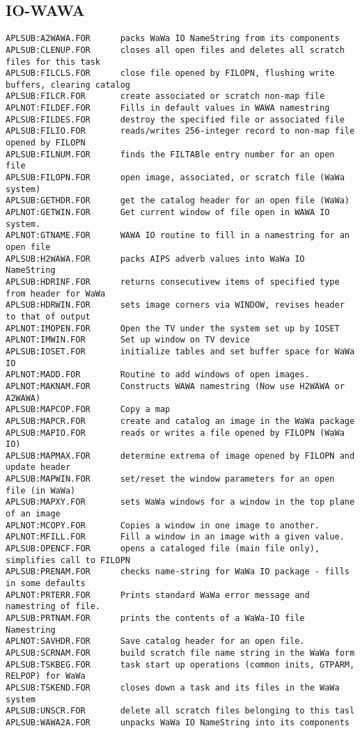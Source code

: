 \subsection{IO-WAWA}
\begin{verbatim}
APLSUB:A2WAWA.FOR      packs WaWa IO NameString from its components
APLSUB:CLENUP.FOR      closes all open files and deletes all scratch files for this task
APLSUB:FILCLS.FOR      close file opened by FILOPN, flushing write buffers, clearing catalog
APLSUB:FILCR.FOR       create associated or scratch non-map file
APLNOT:FILDEF.FOR      Fills in default values in WAWA namestring
APLSUB:FILDES.FOR      destroy the specified file or associated file
APLSUB:FILIO.FOR       reads/writes 256-integer record to non-map file opened by FILOPN
APLSUB:FILNUM.FOR      finds the FILTABle entry number for an open file
APLSUB:FILOPN.FOR      open image, associated, or scratch file (WaWa system)
APLSUB:GETHDR.FOR      get the catalog header for an open file (WaWa)
APLNOT:GETWIN.FOR      Get current window of file open in WAWA IO system.
APLNOT:GTNAME.FOR      WAWA IO routine to fill in a namestring for an open file
APLSUB:H2WAWA.FOR      packs AIPS adverb values into WaWa IO NameString
APLSUB:HDRINF.FOR      returns consecutivew items of specified type from header for WaWa
APLSUB:HDRWIN.FOR      sets image corners via WINDOW, revises header to that of output
APLNOT:IMOPEN.FOR      Open the TV under the system set up by IOSET
APLNOT:IMWIN.FOR       Set up window on TV device
APLSUB:IOSET.FOR       initialize tables and set buffer space for WaWa IO
APLNOT:MADD.FOR        Routine to add windows of open images.
APLNOT:MAKNAM.FOR      Constructs WAWA namestring (Now use H2WAWA or A2WAWA)
APLSUB:MAPCOP.FOR      Copy a map
APLSUB:MAPCR.FOR       create and catalog an image in the WaWa package
APLSUB:MAPIO.FOR       reads or writes a file opened by FILOPN (WaWa IO)
APLSUB:MAPMAX.FOR      determine extrema of image opened by FILOPN and update header
APLSUB:MAPWIN.FOR      set/reset the window parameters for an open file (in WaWa)
APLSUB:MAPXY.FOR       sets WaWa windows for a window in the top plane of an image
APLNOT:MCOPY.FOR       Copies a window in one image to another.
APLNOT:MFILL.FOR       Fill a window in an image with a given value.
APLSUB:OPENCF.FOR      opens a cataloged file (main file only), simplifies call to FILOPN
APLSUB:PRENAM.FOR      checks name-string for WaWa IO package - fills in some defaults
APLNOT:PRTERR.FOR      Prints standard WaWa error message and namestring of file.
APLSUB:PRTNAM.FOR      prints the contents of a WaWa-IO file Namestring
APLNOT:SAVHDR.FOR      Save catalog header for an open file.
APLSUB:SCRNAM.FOR      build scratch file name string in the WaWa form
APLSUB:TSKBEG.FOR      task start up operations (common inits, GTPARM, RELPOP) for WaWa
APLSUB:TSKEND.FOR      closes down a task and its files in the WaWa system
APLSUB:UNSCR.FOR       delete all scratch files belonging to this tasl
APLSUB:WAWA2A.FOR      unpacks WaWa IO NameString into its components
\end{verbatim}
 
